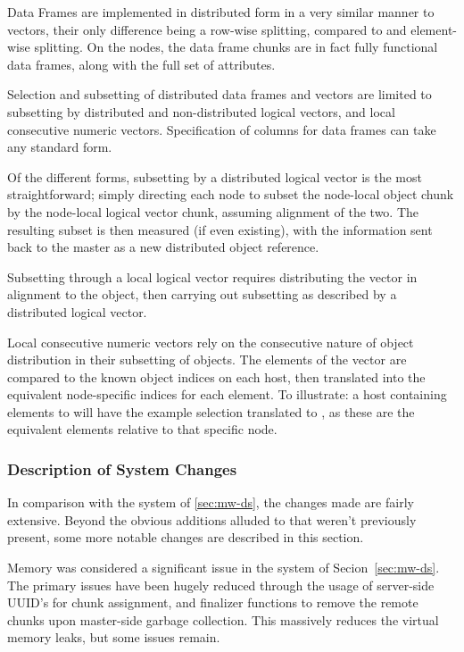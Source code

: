 Data Frames are implemented in distributed form in a very similar manner to vectors, their only difference being a row-wise splitting, compared to and element-wise splitting.
On the nodes, the data frame chunks are in fact fully functional data frames, along with the full set of attributes.

Selection and subsetting of distributed data frames and vectors are limited to subsetting by distributed and non-distributed logical vectors, and local consecutive numeric vectors.
Specification of columns for data frames can take any standard form.

Of the different forms, subsetting by a distributed logical vector is the most straightforward; simply directing each node to subset the node-local object chunk by the node-local logical vector chunk, assuming alignment of the two.
The resulting subset is then measured (if even existing), with the information sent back to the master as a new distributed object reference.

Subsetting through a local logical vector requires distributing the vector in alignment to the object, then carrying out subsetting as described by a distributed logical vector.

Local consecutive numeric vectors rely on the consecutive nature of object distribution in their subsetting of objects.
The elements of the vector are compared to the known object indices on each host, then translated into the equivalent node-specific indices for each element.
To illustrate: a host containing elements  to  will have the example selection  translated to , as these are the equivalent elements relative to that specific node.

\subsubsection{Description of System Changes}\label{sec:description-of-system-changes}

In comparison with the system of \cref{sec:mw-ds}, the changes made are fairly extensive.
Beyond the obvious additions alluded to that weren't previously present, some more notable changes are described in this section.

Memory was considered a significant issue in the system of Secion~\ref{sec:mw-ds}.
The primary issues have been hugely reduced through the usage of server-side UUID's for chunk assignment, and finalizer functions to remove the remote chunks upon master-side garbage collection.
This massively reduces the virtual memory leaks, but some issues remain.

